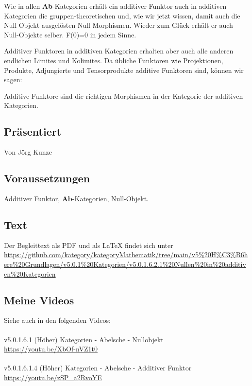 \documentclass[a4paper]{amsart}
\theoremstyle{definition}
\begin{document}
Wie in allen \textbf{Ab}-Kategorien erhält ein additiver Funktor auch in additiven Kategorien die gruppen-theoretischen und, wie wir jetzt wissen, damit auch die Null-Objekt-ausgelösten Null-Morphismen. Wieder zum Glück erhält er auch Null-Objekte selber. F(0)=0 in jedem Sinne.

Additiver Funktoren in additiven Kategorien erhalten aber auch alle anderen endlichen Limites und Kolimites. Da übliche Funktoren wie Projektionen, Produkte, Adjungierte und Tensorprodukte additive Funktoren sind, können wir sagen:

Additive Funktore sind die richtigen Morphismen in der Kategorie der additiven Kategorien.

\subsection*{Präsentiert}
Von Jörg Kunze

\subsection*{Voraussetzungen}
Additiver Funktor, \textbf{Ab}-Kategorien, Null-Objekt.

\subsection*{Text}
Der Begleittext als PDF und als LaTeX findet sich unter
{\tiny
   \url{https://github.com/kategory/kategoryMathematik/tree/main/v5%20H%C3%B6here%20Grundlagen/v5.0.1%20Kategorien/v5.0.1.6.2.1%20Nullen%20in%20additiven%20Kategorien}
}

\subsection*{Meine Videos}
Siehe auch in den folgenden Videos:\\ 
\\
v5.0.1.6.1 (Höher) Kategorien - Abelsche - Nullobjekt\\
\url{https://youtu.be/XbOf-nVZ1t0}\\
\\
v5.0.1.6.1.4 (Höher) Kategorien - Abelsche - Additiver Funktor\\
\url{https://youtu.be/zSP_a2RvoYE}
\end{document}

